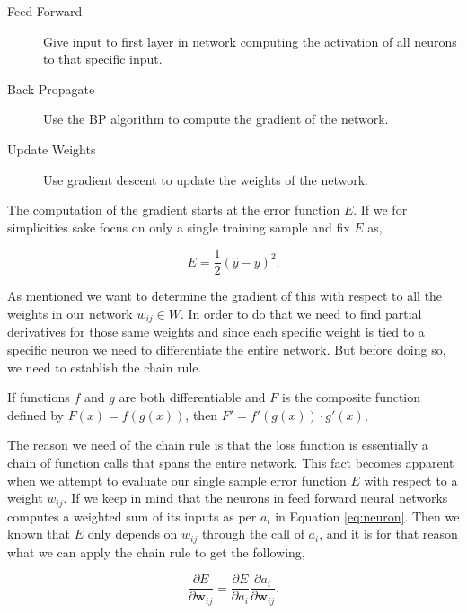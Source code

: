\begin{description}
    \item[Feed Forward] Give input to first layer in network computing the
        activation of all neurons to that specific input.
    \item[Back Propagate] Use the \gls{BP} algorithm to compute the gradient of
        the network.
    \item[Update Weights] Use gradient descent to update the weights of the
        network.
\end{description}

The computation of the gradient starts at the error function $E$. If we for
simplicities sake focus on only a single training sample and fix $E$ as,

\begin{equation}
    E = \frac{1}{2}(\hat{y} - y)^2.
\end{equation}

As mentioned we want to determine the gradient of this with respect to all the
weights in our network $w_{ij} \in W$. In order to do that we need to find
partial derivatives for those same weights and since each specific weight is
tied to a specific neuron we need to differentiate the entire network. But
before doing so, we need to establish the chain rule.

\begin{lemma}
\label{lemma:chainrule}

    If functions $f$ and $g$ are both differentiable and $F$ is the composite
    function defined by $F(x) = f(g(x))$, then $F' = f'(g(x)) \cdot g'(x)$,

\end{lemma}

The reason we need of the chain rule is that the loss function is essentially
a chain of function calls that spans the entire network. This fact becomes
apparent when we attempt to evaluate our single sample error function $E$ with
respect to a weight $w_{ij}$. If we keep in mind that the neurons in feed
forward neural networks computes a weighted sum of its inputs as per $a_i$ in
Equation \eqref{eq:neuron}. Then we known that $E$ only depends on $w_{ij}$
through the call of $a_i$, and it is for that reason what we can apply the chain
rule to get the following,

\begin{equation} \label{eq:bp_start}
    \frac{\partial E}{\partial \mathbf{w}_{ij}} = \frac{\partial E}{\partial a_i}
    \frac{\partial a_i}{\partial \mathbf{w}_{ij}}.
\end{equation}

